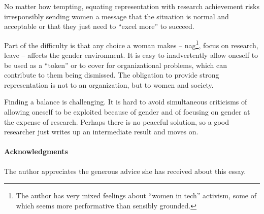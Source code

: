 \documentclass[a4paper,10pt,twocolumn]{article}
\begin{document}
No matter how tempting, equating representation with research
achievement risks irresponsibly sending women a message that the
situation is normal and acceptable or that they just need to ``excel
more'' to succeed.

Part of the difficulty is that any choice a woman makes --
nag\footnote{The author has very mixed feelings about ``women in
tech'' activism, some of which seems more performative than sensibly
grounded.}, focus on research, leave -- affects the gender
environment.  It is easy to inadvertently allow oneself to be used as
a ``token'' or to cover for organizational problems, which can
contribute to them being dismissed.  The obligation to provide strong
representation is not to an organization, but to women and society.


Finding a balance is challenging.  It is hard to avoid simultaneous
criticisms of allowing oneself to be exploited because of gender and
of focusing on gender at the expense of research.  Perhaps there is no
peaceful solution, so a good researcher just writes up an intermediate
result and moves on.







\paragraph{Acknowledgments}
The author appreciates the generous advice she has received about this
essay.
\end{document}
